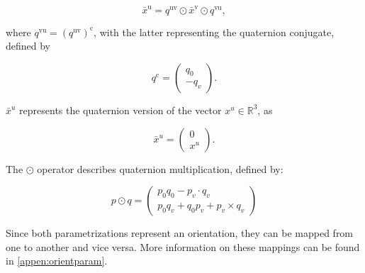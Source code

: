 \begin{equation}
	\label{eq:quat_rot}
	\bar{x}^{\mathrm{u}}=q^{\mathrm{uv}} \odot \bar{x}^{\mathrm{v}} \odot q^{\mathrm{vu}},
\end{equation}

where $q^{\mathrm{vu}} = \left(q^{\mathrm{uv}}\right)^{\mathrm{c}}$, with the latter representing the quaternion conjugate, defined by 

\begin{equation}
	\label{eq:quat_conjugate}
	q^{\mathrm{c}}=\left(\begin{array}{c}{q_{0}} \\ {-q_{v}}\end{array}\right).
\end{equation}

$\bar{x}^u$ represents the quaternion version of the vector $x^u \in \mathbb{R}^3$, as

\begin{equation}
	\label{eq:quat_vec_ref}
	\bar{x}^u=\left(\begin{array}{l}{0} \\ {x^u}\end{array}\right).
\end{equation}


The $\odot$ operator describes quaternion multiplication, defined by:

\begin{equation}
	\label{eq:quat_multiplication}
	p \odot q=\left(\begin{array}{c}{p_{0} q_{0}-p_{v} \cdot q_{v}} \\ {p_{0} q_{v}+q_{0} p_{v}+p_{v} \times q_{v}}\end{array}\right)
\end{equation}

Since both parametrizations represent an orientation, they can be mapped from one to another and vice versa. More information on these mappings can be found in \cref{appen:orientparam}.


